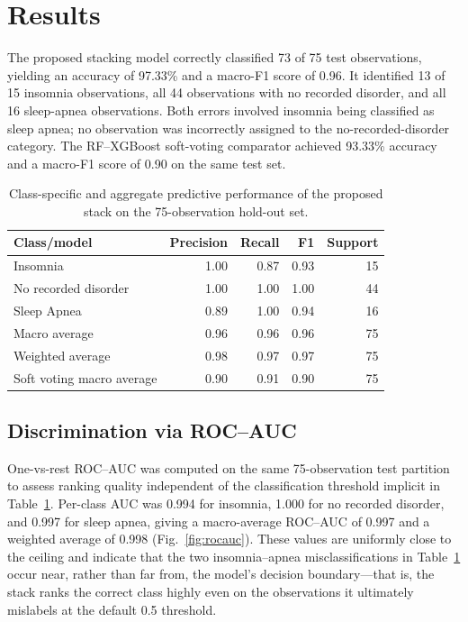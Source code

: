 \documentclass{elektr}
\begin{document}
\section{Results}
The proposed stacking model correctly classified 73 of 75 test observations, yielding an accuracy of 97.33\% and a macro-F1 score of 0.96. It identified 13 of 15 insomnia observations, all 44 observations with no recorded disorder, and all 16 sleep-apnea observations. Both errors involved insomnia being classified as sleep apnea; no observation was incorrectly assigned to the no-recorded-disorder category. The RF--XGBoost soft-voting comparator achieved 93.33\% accuracy and a macro-F1 score of 0.90 on the same test set.

\begin{table}[t]
\centering
\caption{Class-specific and aggregate predictive performance of the proposed stack on the 75-observation hold-out set.}
\label{tab:metrics}
\small
\begin{tabular}{lrrrr}
\toprule
Class/model & Precision & Recall & F1 & Support \\
\midrule
Insomnia & 1.00 & 0.87 & 0.93 & 15 \\
No recorded disorder & 1.00 & 1.00 & 1.00 & 44 \\
Sleep Apnea & 0.89 & 1.00 & 0.94 & 16 \\
Macro average & 0.96 & 0.96 & 0.96 & 75 \\
Weighted average & 0.98 & 0.97 & 0.97 & 75 \\
\midrule
Soft voting macro average & 0.90 & 0.91 & 0.90 & 75 \\
\bottomrule
\end{tabular}
\end{table}

\subsection{Discrimination via ROC--AUC}
\label{sec:rocauc}
One-vs-rest ROC--AUC was computed on the same 75-observation test partition to assess ranking quality independent of the classification threshold implicit in Table~\ref{tab:metrics}. Per-class AUC was 0.994 for insomnia, 1.000 for no recorded disorder, and 0.997 for sleep apnea, giving a macro-average ROC--AUC of 0.997 and a weighted average of 0.998 (Fig.~\ref{fig:rocauc}). These values are uniformly close to the ceiling and indicate that the two insomnia--apnea misclassifications in Table~\ref{tab:metrics} occur near, rather than far from, the model's decision boundary---that is, the stack ranks the correct class highly even on the observations it ultimately mislabels at the default 0.5 threshold.
\end{document}
